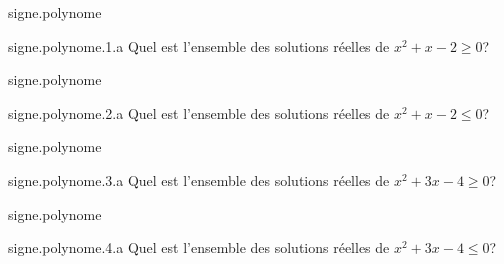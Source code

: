 \begin{qcm}{signe.polynome}
    \begin{question}{signe.polynome.1.a}
         Quel est l'ensemble des solutions réelles de \(x^2+x-2\geqslant 0\)?
         \vspace{0.1cm}
         \begin{reponses}
            \bonne{\(]-\infty,-2]\cup[1,+\infty[\)}
            \mauvaise{\(]-\infty,-1]\cup[2,+\infty[\)}
            \mauvaise{\([0,1]\)}
            \mauvaise{\([-2,1]\)}
            \mauvaise{\([-1,2]\)}
         \end{reponses}
         \vspace{0.4cm}
    \end{question}
\end{qcm}


\begin{qcm}{signe.polynome}
    \begin{question}{signe.polynome.2.a}
         Quel est l'ensemble des solutions réelles de \(x^2+x-2\leqslant 0\)?
         \vspace{0.1cm}
         \begin{reponses}
            \mauvaise{\(]-\infty,-2]\cup[1,+\infty[\)}
            \mauvaise{\(]-\infty,-1]\cup[2,+\infty[\)}
            \mauvaise{\([0,1]\)}
            \bonne{\([-2,1]\)}
            \mauvaise{\([-1,2]\)}
         \end{reponses}
         \vspace{0.4cm}
    \end{question}
\end{qcm}

\begin{qcm}{signe.polynome}
    \begin{question}{signe.polynome.3.a}
         Quel est l'ensemble des solutions réelles de \(x^2+3x-4\geqslant 0\)?
         \vspace{0.1cm}
         \begin{reponses}
            \bonne{\(]-\infty,-4]\cup[1,+\infty[\)}
            \mauvaise{\(]-\infty,-1]\cup[4,+\infty[\)}
            \mauvaise{\([0,1]\)}
            \mauvaise{\([-4,1]\)}
            \mauvaise{\([-1,4]\)}
         \end{reponses}
         \vspace{0.4cm}
    \end{question}
\end{qcm}


\begin{qcm}{signe.polynome}
    \begin{question}{signe.polynome.4.a}
         Quel est l'ensemble des solutions réelles de \(x^2+3x-4\leqslant 0\)?
         \vspace{0.1cm}
         \begin{reponses}
            \mauvaise{\(]-\infty,-4]\cup[1,+\infty[\)}
            \mauvaise{\(]-\infty,-1]\cup[4,+\infty[\)}
            \mauvaise{\([0,1]\)}
            \bonne{\([-4,1]\)}
            \mauvaise{\([-1,4]\)}
         \end{reponses}
         \vspace{0.4cm}
    \end{question}
\end{qcm}


